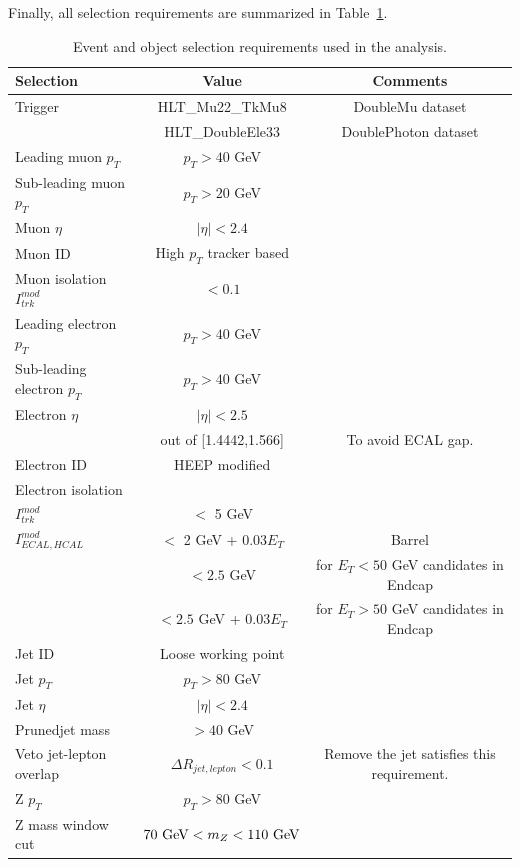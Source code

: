 Finally, all selection requirements are summarized in Table~\ref{tab:preselection}.
\newpage

\begin{center}
  \begin{table}[h]
    \begin{center}
      \begin{tabular}{|lcc|}
        \hline
        \textbf{Selection} & \textbf{Value} & \textbf{Comments} \\ \hline
        Trigger & HLT\_Mu22\_TkMu8 & DoubleMu dataset \\
        & HLT\_DoubleEle33 & DoublePhoton dataset \\ \hline
        Leading muon $p_{T}$ & $p_{T} > 40$ GeV &\\
        Sub-leading muon $p_{T}$ & $p_{T} > 20$ GeV &\\
        Muon $\eta$ & $|\eta| < 2.4$ &\\
        Muon ID & High $p_{T}$ tracker based &\\
        Muon isolation $I_{trk}^{mod}$ & $< 0.1$ &\\ \hline
        Leading electron $p_{T}$ & $p_{T} > 40$ GeV &\\
        Sub-leading electron $p_{T}$ & $p_{T} > 40$ GeV &\\
        Electron $\eta$ & $|\eta| < 2.5$ &\\
        & out of [1.4442,1.566] & To avoid ECAL gap. \\
        Electron ID & HEEP modified &\\
        Electron isolation  & &\\
        $I_{trk}^{mod}$ & $<$ 5 GeV &\\
        $I_{ECAL,HCAL}^{mod}$ & $<$ 2 GeV + 0.03$E_{T}$ & Barrel \\
        & $< 2.5$ GeV & for $E_{T} < 50$ GeV candidates in Endcap\\
        & $< 2.5$ GeV + 0.03$E_{T}$ & for $E_{T} > 50$ GeV candidates in Endcap\\ \hline
        Jet ID & Loose working point &\\
        Jet $p_{T}$ & $p_{T} > 80$ GeV &\\
        Jet $\eta$ & $|\eta| < 2.4$ &\\
        Prunedjet mass & $> 40$ GeV &\\
        Veto jet-lepton overlap & $\Delta R_{jet,lepton} < 0.1$ & Remove the jet satisfies this requirement.\\ \hline
        Z $p_{T}$ & $p_{T} > 80$ GeV &\\
        Z mass window cut & $70 \textup{ GeV} < m_{Z} < 110 \textup{ GeV}$ &\\
        \hline
      \end{tabular}
    \end{center}
    \caption{\label{tab:preselection}Event and object selection requirements used in the analysis.}
  \end{table}
\end{center}

